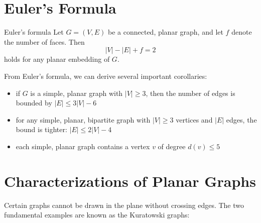 \documentclass[a4paper, 11pt]{report}
\begin{document}
\section{Euler's Formula}
\begin{thmframe}{Euler's formula}{}
Let $G=(V,E)$ be a connected, planar graph, and let $f$ denote the number of faces. Then 
$$|V|-|E|+f=2$$
holds for any planar embedding of $G$.
\end{thmframe}

From Euler's formula, we can derive several important corollaries:
\begin{itemize}
    \item if $G$ is a simple, planar graph with $|V| \ge 3$, then the number of edges is bounded by $|E| \le 3|V| - 6$
    \item for any simple, planar, bipartite graph with $|V| \ge 3$ vertices and $|E|$ edges, the bound is tighter: $|E| \le 2|V| - 4$
    \item each simple, planar graph contains a vertex $v$ of degree $d(v) \le 5$
\end{itemize}

\section{Characterizations of Planar Graphs}
Certain graphs cannot be drawn in the plane without crossing edges. The two fundamental examples are known as the Kuratowski graphs:

\begin{center}
\end{center}
\end{document}
